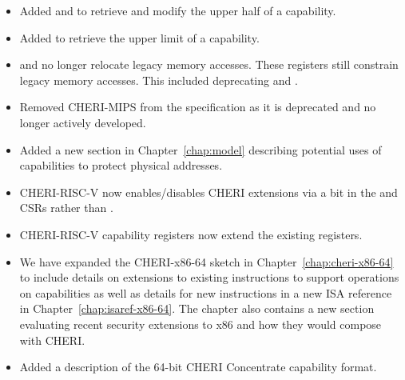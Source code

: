\begin{itemize}
\item Added  and  to retrieve and
  modify the upper half of a capability.

\item Added  to retrieve the upper limit of a
  capability.

\item \DDC{} and \PCC{} no longer relocate legacy memory accesses.
  These registers still constrain legacy memory accesses.  This
  included deprecating  and .

\item Removed CHERI-MIPS from the specification as it is deprecated
  and no longer actively developed.

\item Added a new section in Chapter~\ref{chap:model} describing
  potential uses of capabilities to protect physical addresses.

\item CHERI-RISC-V now enables/disables CHERI extensions via a bit in
  the \menvcfg{} and \senvcfg{} CSRs rather than \xccsr{}.

\item CHERI-RISC-V \xScratchC{} capability registers now extend the
  existing \xscratch{} registers.

\item We have expanded the CHERI-x86-64 sketch in
  Chapter~\ref{chap:cheri-x86-64} to include details on extensions to
  existing instructions to support operations on capabilities as well
  as details for new instructions in a new ISA reference in
  Chapter~\ref{chap:isaref-x86-64}.  The chapter also contains a new
  section evaluating recent security extensions to x86 and how they
  would compose with CHERI.

\item Added a description of the 64-bit CHERI Concentrate capability
  format.
\end{itemize}
